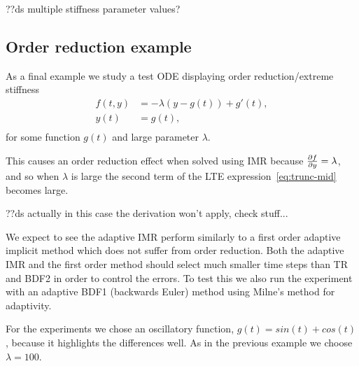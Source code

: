 ??ds multiple stiffness parameter values?


\subsection{Order reduction example}
\label{sec:order-reduct-example}

As a final example we study a test ODE displaying order reduction/extreme stiffness\cite[pg. 156]{Atkinson2009}
\begin{equation}
  \label{eqn:imr-test-order-reduction}
  \begin{aligned}
    f(t, y) &= -\lambda (y - g(t)) + g'(t), \\
    y(t) &= g(t), \\
  \end{aligned}
\end{equation}
for some function $g(t)$ and large parameter $\lambda$.

This causes an order reduction effect when solved using IMR because $\frac{\partial f}{\partial y} = \lambda$, and so when $\lambda$ is large the second term of the LTE expression~\eqref{eq:trunc-mid} becomes large.

??ds actually in this case the derivation won't apply, check stuff...

We expect to see the adaptive IMR perform similarly to a first order adaptive implicit method which does not suffer from order reduction.
Both the adaptive IMR and the first order method should select much smaller time steps than TR and BDF2 in order to control the errors.
To test this we also run the experiment with an adaptive BDF1 (backwards Euler) method using Milne's method for adaptivity.

For the experiments we chose an oscillatory function, $g(t) = sin(t) + cos(t)$, because it highlights the differences well.
As in the previous example we choose $\lambda = 100$. 



